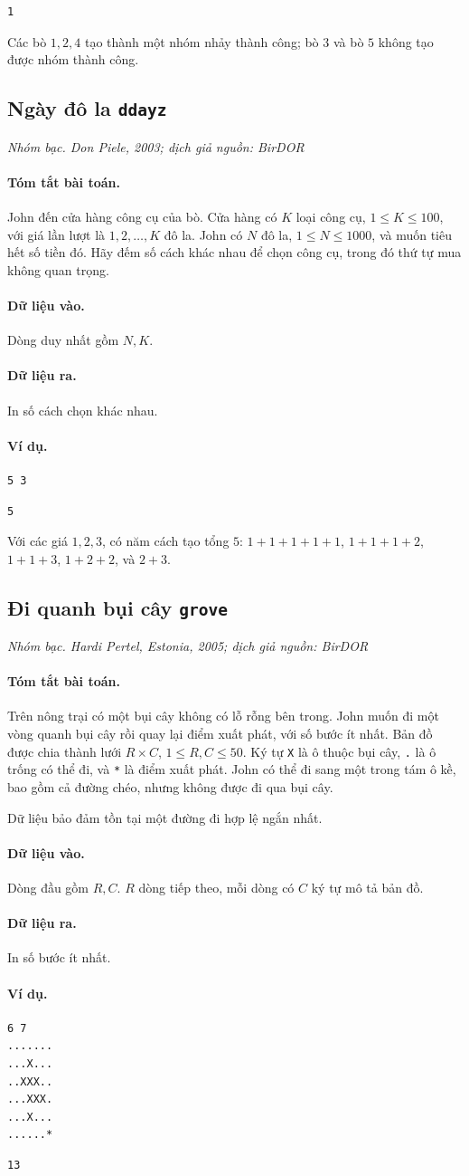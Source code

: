 \documentclass[11pt]{article}
\newcommand{\problem}[4]{%
  \subsection[#1 (#2)]{#1 \hfill {\normalsize\texttt{#2}}}%
  \noindent\textit{#3. #4}\par\smallskip
}
\newcommand{\iosec}[1]{\paragraph{#1}}
\begin{document}
\begin{verbatim}
1
\end{verbatim}

Các bò \(1,2,4\) tạo thành một nhóm nhảy thành công; bò \(3\) và bò \(5\)
không tạo được nhóm thành công.

\problem{Ngày đô la}{ddayz}{Nhóm bạc}{Don Piele, 2003; dịch giả nguồn: BirDOR}

\iosec{Tóm tắt bài toán.}
John đến cửa hàng công cụ của bò. Cửa hàng có \(K\) loại công cụ,
\(1\le K\le 100\), với giá lần lượt là \(1,2,\ldots,K\) đô la. John có
\(N\) đô la, \(1\le N\le 1000\), và muốn tiêu hết số tiền đó. Hãy đếm số cách
khác nhau để chọn công cụ, trong đó thứ tự mua không quan trọng.

\iosec{Dữ liệu vào.}
Dòng duy nhất gồm \(N,K\).

\iosec{Dữ liệu ra.}
In số cách chọn khác nhau.

\iosec{Ví dụ.}
\begin{verbatim}
5 3
\end{verbatim}

\begin{verbatim}
5
\end{verbatim}

Với các giá \(1,2,3\), có năm cách tạo tổng \(5\): \(1+1+1+1+1\),
\(1+1+1+2\), \(1+1+3\), \(1+2+2\), và \(2+3\).

\problem{Đi quanh bụi cây}{grove}{Nhóm bạc}{Hardi Pertel, Estonia, 2005; dịch giả nguồn: BirDOR}

\iosec{Tóm tắt bài toán.}
Trên nông trại có một bụi cây không có lỗ rỗng bên trong. John muốn đi một
vòng quanh bụi cây rồi quay lại điểm xuất phát, với số bước ít nhất. Bản đồ
được chia thành lưới \(R\times C\), \(1\le R,C\le 50\). Ký tự \texttt{X} là
ô thuộc bụi cây, \texttt{.} là ô trống có thể đi, và \texttt{*} là điểm xuất
phát. John có thể đi sang một trong tám ô kề, bao gồm cả đường chéo, nhưng
không được đi qua bụi cây.

Dữ liệu bảo đảm tồn tại một đường đi hợp lệ ngắn nhất.

\iosec{Dữ liệu vào.}
Dòng đầu gồm \(R,C\). \(R\) dòng tiếp theo, mỗi dòng có \(C\) ký tự mô tả bản
đồ.

\iosec{Dữ liệu ra.}
In số bước ít nhất.

\iosec{Ví dụ.}
\begin{verbatim}
6 7
.......
...X...
..XXX..
...XXX.
...X...
......*
\end{verbatim}

\begin{verbatim}
13
\end{verbatim}
\end{document}
